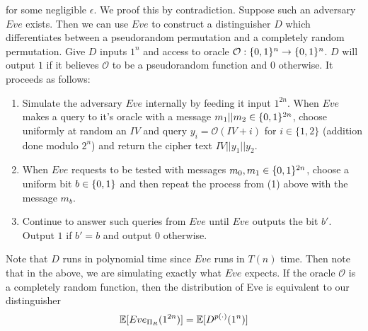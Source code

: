 \documentclass{article}
\begin{document}
\begin{enumerate}
\begin{enumerate}[,label=\alph*.]
for some negligible $\epsilon$. We proof this by contradiction. Suppose such an adversary 
$Eve$ exists. Then we can use $Eve$ to construct a distinguisher $D$ which differentiates between 
a pseudorandom permutation and a completely random permutation. Give $D$ inputs $1^n$ and access 
to oracle $\mathcal{O}: \{0,1\}^n \to \{0,1\}^n$. $D$ will output $1$ if it believes $\mathcal{O}$ to be a 
pseudorandom function and $0$ otherwise. It proceeds as follows:%

\begin{enumerate}[noitemsep,topsep=\mdcompacttopsep]%

\item{}Simulate the adversary $Eve$ internally by feeding it input $1^{2n}$. 
When $Eve$ makes a query to it's oracle with a message $m_1 || m_2 \in \{0,1\}^{2n}$, 
choose uniformly at random an $IV$ and query $y_i = \mathcal{O}(IV + i)$ for 
$i \in \{1,2\}$ (addition done modulo $2^n$) and return the cipher text $IV || y_1 || y_2$.%

\item{}When $Eve$ requests to be tested with messages $m_0,m_1 \in \{0,1\}^{2n}$, choose a uniform bit
$b \in \{0,1\}$ and then repeat the process from (1) above with the message $m_b$.%

\item{}Continue to answer such queries from $Eve$ until $Eve$ outputs the bit $b'$. Output $1$ if $b' = b$
and output $0$ otherwise.%
\end{enumerate}%

Note that $D$ runs in polynomial time since $Eve$ runs in $T(n)$ time. Then note that in the above,
we are simulating exactly what $Eve$ expects. If the oracle $\mathcal{O}$ is a completely random
function, then the distribution of Eve is equivalent to our distinguisher%
\noindent\noindent\[%
\E[Eve_{\Pi_R}(1^{2n})] = \E[D^{p(\cdot)}(1^n)]
\]%


\end{enumerate}
\end{enumerate}
\end{document}
